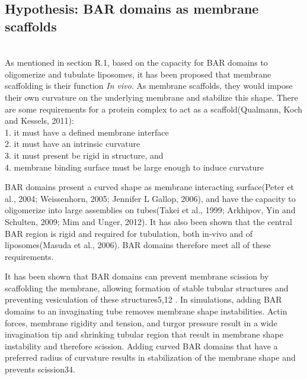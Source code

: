 \subsection{Hypothesis: BAR domains as membrane scaffolds}
				\mbox{}\\
As mentioned in section R.1, based on the capacity for BAR domains to oligomerize and tubulate liposomes, it has been proposed that membrane scaffolding is their function \textit{In vivo}. As membrane scaffolds, they would impose their own curvature on the underlying membrane and stabilize this shape. There are some requirements for a protein complex to act as a scaffold(Qualmann, Koch and Kessels, 2011):\\
	1. it must have a defined membrane interface\\
	2. it must have an intrinsic curvature\\
	3. it must present be rigid in structure, and\\
	4. membrane binding surface must be large enough to induce curvature\\

\vspace{-1mm}

BAR domains present a curved shape as membrane interacting surface(Peter et al., 2004; Weissenhorn, 2005; Jennifer L Gallop, 2006), and have the capacity to oligomerize into large assemblies on tubes(Takei et al., 1999; Arkhipov, Yin and Schulten, 2009; Mim and Unger, 2012). It has also been shown that the central BAR region is rigid and required for tubulation, both in-vivo and of liposomes(Masuda et al., 2006). BAR domains therefore meet all of these requirements. 

	\vspace{5mm}
It has been shown that BAR domains can prevent membrane scission by scaffolding the membrane, allowing formation of stable tubular structures and preventing vesiculation of these structures5,12 . In simulations, adding BAR domains to an invaginating tube removes membrane shape instabilities. Actin forces, membrane rigidity and tension, and turgor pressure result in a wide invagination tip and shrinking tubular region that result in membrane shape instability and therefore scission. Adding curved BAR domains that have a preferred radius of curvature results in stabilization of the membrane shape and prevents scission34.

